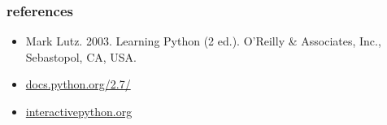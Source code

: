 \documentclass{beamer}
\begin{document}
%         




\begin{frame}
 \frametitle{references}
 \begin{itemize}
  \item Mark Lutz. 2003. Learning Python (2 ed.). O'Reilly \& Associates, Inc., Sebastopol, CA, USA.
  \item \href{https://docs.python.org/2.7/}{docs.python.org/2.7/}
  \item \href{http://interactivepython.org}{interactivepython.org}
 \end{itemize}
\end{frame}
\end{document}
